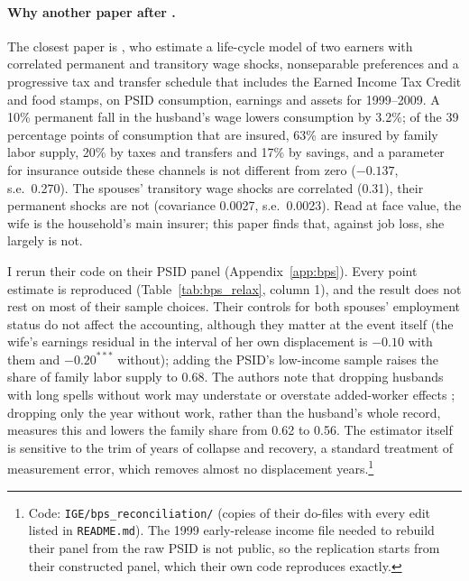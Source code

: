 \paragraph{Why another paper after \citet{blundell2016consumption}.} The closest paper is
\citet{blundell2016consumption}, who estimate a life-cycle model of two earners with correlated permanent and
transitory wage shocks, nonseparable preferences and a progressive tax and transfer schedule that includes the Earned
Income Tax Credit and food stamps, on PSID consumption, earnings and assets for 1999--2009. A 10\% permanent fall in the
husband's wage lowers consumption by 3.2\%; of the 39 percentage points of consumption that are insured, 63\% are insured
by family labor supply, 20\% by taxes and transfers and 17\% by savings, and a parameter for insurance outside these
channels is not different from zero ($-0.137$, s.e.\ 0.270). The spouses' transitory wage shocks are correlated (0.31),
their permanent shocks are not (covariance 0.0027, s.e.\ 0.0023). Read at face value, the wife is the household's main
insurer; this paper finds that, against job loss, she largely is not.

I rerun their code on their PSID panel (Appendix~\ref{app:bps}). Every point estimate is reproduced
(Table~\ref{tab:bps_relax}, column 1), and the result does not rest on most of their sample choices. Their
controls for both spouses' employment status do not affect the accounting, although they matter at the event itself
(the wife's earnings residual in the interval of her own displacement is $-0.10$ with them and $-0.20^{***}$ without);
adding the PSID's low-income sample raises the share of family labor supply to 0.68. The authors note that dropping
husbands with long spells without work may understate or overstate added-worker effects
\citep[p.~403]{blundell2016consumption}; dropping only the year without work, rather than the husband's whole record,
measures this and lowers the family share from 0.62 to 0.56. The estimator itself is sensitive to the trim of years of
collapse and recovery, a standard treatment of measurement error, which removes almost no displacement years.\footnote{Code:
\texttt{IGE/bps\_reconciliation/} (copies of their do-files with every edit listed in \texttt{README.md}). The 1999
early-release income file needed to rebuild their panel from the raw PSID is not public, so the replication starts from
their constructed panel, which their own code reproduces exactly.}

